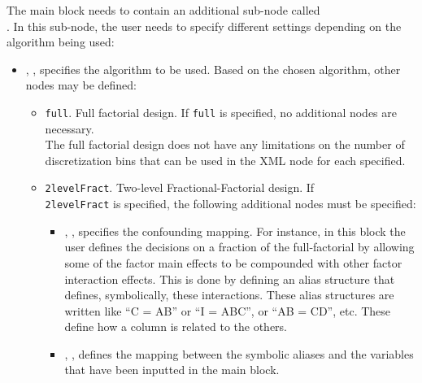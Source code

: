 The main  block needs to contain an additional sub-node
called\\.
%
In this sub-node, the user needs to specify different settings depending on the
algorithm being used:
   \begin{itemize}
    \item {}, , specifies the
      algorithm to be used.
      Based on the chosen algorithm, other nodes may be defined:
      \begin{itemize}
        \item {}\texttt{full}. Full factorial design.
          If \texttt{full} is specified, no additional nodes are necessary.
          \\
          \nb The full factorial design does not have any limitations on the
          number of discretization bins that can be used in the 
          XML node for each  specified.
        \item {}\texttt{2levelFract}. Two-level
          Fractional-Factorial design.
          If \\\texttt{2levelFract}  is specified, the following additional
          nodes must be specified:
          \begin{itemize}
            \item {}, , specifies the confounding mapping.
              For instance, in this block the user defines the decisions on a
              fraction of the full-factorial by allowing some of the factor main
              effects to be compounded with other factor interaction effects.
              This is done by defining an alias structure that defines,
              symbolically, these interactions.
              These alias structures are written like “C = AB” or “I = ABC”, or
              “AB = CD”, etc.
              These define how a column is related to the others.
            \item {}, , defines the mapping between the  symbolic
              aliases and the variables that have been inputted in the
               main block.

\end{itemize}
\end{itemize}
\end{itemize}
